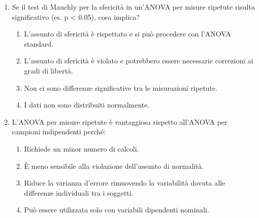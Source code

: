 \documentclass[12pt, a4paper]{article}
\begin{document}
\begin{enumerate}[resume]
    \item Se il test di Mauchly per la sfericità in un'ANOVA per misure ripetute risulta significativo (es. p < 0.05), cosa implica?
    \begin{enumerate}
        \item L'assunto di sfericità è rispettato e si può procedere con l'ANOVA standard.
        \item L'assunto di sfericità è violato e potrebbero essere necessarie correzioni ai gradi di libertà.
        \item Non ci sono differenze significative tra le misurazioni ripetute.
        \item I dati non sono distribuiti normalmente.
    \end{enumerate}
    \vspace{0.3cm}

    \item L'ANOVA per misure ripetute è vantaggiosa rispetto all'ANOVA per campioni indipendenti perché:
    \begin{enumerate}
        \item Richiede un minor numero di calcoli.
        \item È meno sensibile alla violazione dell'assunto di normalità.
        \item Riduce la varianza d'errore rimuovendo la variabilità dovuta alle differenze individuali tra i soggetti.
        \item Può essere utilizzata solo con variabili dipendenti nominali.
    \end{enumerate}
    \vspace{0.3cm}
\end{enumerate}

\end{document}
